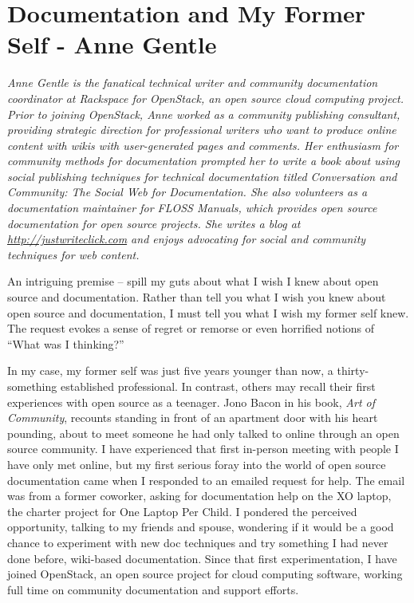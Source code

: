\chapter{Documentation and My Former Self - Anne Gentle}

\textit{Anne Gentle is the fanatical technical writer and community
documentation coordinator at Rackspace for OpenStack, an open source cloud
computing project. Prior to joining OpenStack, Anne worked as a community
publishing consultant, providing strategic direction for professional writers
who want to produce online content with wikis with user-generated pages and
comments. Her enthusiasm for community methods for documentation prompted her to
write a book about using social publishing techniques for technical
documentation titled Conversation and Community: The Social Web for
Documentation. She also volunteers as a documentation maintainer for FLOSS
Manuals, which provides open source documentation for open source projects. She
writes a blog at \url{http://justwriteclick.com} and enjoys advocating for
social and community techniques for web content.}

An intriguing premise -- spill my guts about what I wish I knew about open
source and documentation. Rather than tell you what I wish you knew about open
source and documentation, I must tell you what I wish my former self knew. The
request evokes a sense of regret or remorse or even horrified notions of ``What
was I thinking?'' 

In my case, my former self was just five years younger than now, a
thirty-something established professional. In contrast, others may recall their
first experiences with open source as a teenager. Jono Bacon in his book,
\textit{Art of Community}, recounts standing in front of an apartment door with
his heart pounding, about to meet someone he had only talked to online through
an open source community. I have experienced that first in-person meeting with
people I have only met online, but my first serious foray into the world of open
source documentation came when I responded to an emailed request for help. The
email was from a former coworker, asking for documentation help on the XO
laptop, the charter project for One Laptop Per Child. I pondered the perceived
opportunity, talking to my friends and spouse, wondering if it would be a good
chance to experiment with new doc techniques and try something I had never done
before, wiki-based documentation. Since that first experimentation, I have joined
OpenStack, an open source project for cloud computing software, working full
time on community documentation and support efforts. 

